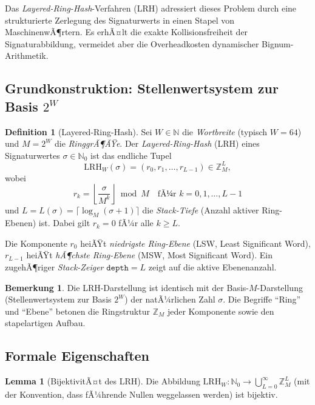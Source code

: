 ﻿\documentclass[a4paper,12pt]{article}
\theoremstyle{definition}
\newtheorem{definition}{Definition}
\newtheorem{lemma}{Lemma}
\newtheorem{bemerkung}{Bemerkung}
\begin{document}
Das \emph{Layered-Ring-Hash}-Verfahren (LRH) adressiert dieses Problem durch eine
strukturierte Zerlegung des Signaturwerts in einen Stapel von MaschinenwÃ¶rtern.
Es erhÃ¤lt die exakte Kollisionsfreiheit der Signaturabbildung, vermeidet aber die
Overheadkosten dynamischer Bignum-Arithmetik.

\subsection{Grundkonstruktion: Stellenwertsystem zur Basis $2^W$}

\begin{definition}[Layered-Ring-Hash]
\label{def:lrh}
Sei $W \in \mathbb{N}$ die \emph{Wortbreite} (typisch $W = 64$) und
$M = 2^W$ die \emph{RinggrÃ¶ÃŸe}. Der \emph{Layered-Ring-Hash} (LRH) eines
Signaturwertes $\sigma \in \mathbb{N}_0$ ist das endliche Tupel
\[
  \mathrm{LRH}_W(\sigma) = (r_0, r_1, \ldots, r_{L-1}) \in \mathbb{Z}_M^L,
\]
wobei
\[
  r_k = \left\lfloor \frac{\sigma}{M^k} \right\rfloor \bmod M
        \quad \text{fÃ¼r } k = 0, 1, \ldots, L-1
\]
und $L = L(\sigma) = \lceil \log_M(\sigma + 1) \rceil$ die \emph{Stack-Tiefe}
(Anzahl aktiver Ring-Ebenen) ist. Dabei gilt $r_k = 0$ fÃ¼r alle $k \geq L$.

Die Komponente $r_0$ heiÃŸt \emph{niedrigste Ring-Ebene} (LSW, Least Significant Word),
$r_{L-1}$ heiÃŸt \emph{hÃ¶chste Ring-Ebene} (MSW, Most Significant Word).
Ein zugehÃ¶riger \emph{Stack-Zeiger} $\mathtt{depth} = L$ zeigt auf die aktive Ebenenanzahl.
\end{definition}

\begin{bemerkung}
Die LRH-Darstellung ist identisch mit der Basis-$M$-Darstellung (Stellenwertsystem zur
Basis $2^W$) der natÃ¼rlichen Zahl $\sigma$. Die Begriffe ``Ring'' und ``Ebene'' betonen
die Ringstruktur $\mathbb{Z}_M$ jeder Komponente sowie den stapelartigen Aufbau.
\end{bemerkung}

\subsection{Formale Eigenschaften}

\begin{lemma}[BijektivitÃ¤t des LRH]
\label{lem:lrh_bij}
Die Abbildung $\mathrm{LRH}_W: \mathbb{N}_0 \to \bigcup_{L=0}^{\infty} \mathbb{Z}_M^L$
(mit der Konvention, dass fÃ¼hrende Nullen weggelassen werden) ist bijektiv.
\end{lemma}
\end{document}
